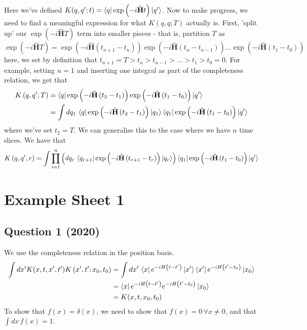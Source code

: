 \documentclass[11pt, oneside]{article}   	%
\theoremstyle{slanted}
\renewcommand{\op}[1]{\hat{\mathbf{#1}}}
\begin{document}
Here we've defined $ K ( q , q '; t )  = \bra{q}\exp\left(  - i \op{H } t  \right) \ket{ q ' } $. 
Now to make progress, we need to find
a meaningful expression for what $ K \left( q, q ; T \right)  $ 
actually is. First, 'split up' 
our $ \exp (  - i \op{H } T)$ term into smaller pieces - 
that is, partition $ T $ as 
\begin{equation}
	\exp\left(  - i \op{H } T  \right)  = 
	\exp \left(  - i \op{H } \left( t_{ n + 1 }  - t _ n  \right)   \right) \exp \left(  - i \op{H } \left( t_n  - t_{ n - 1 }  \right)   \right)  \dots \exp\left(  - i \op{H } \left( t _ 1  - t _ 0  \right)   \right)  
\end{equation} here, we set by definition that 
$ t_{ n + 1 }  =T  > t _ n > t _{ n - 1 } > \dots > t _ 1 > t _ 0 = 0 $. For example, setting $ n = 1$ and inserting one 
integral as part of the completeness relation, 
we get that 
\begin{align*}
	K \left( q, q' ; T  \right)  &=  
	\bra{ q }\exp\left(  - i \op{H } \left( t_2 - t_1  \right)  \right) \exp\left(  - i \op{ H } \left( t_1  - t_0   \right)   \right) \ket{q ' }  \\
	&=  \int d q_1 \,  
	\bra{ q } \exp\left(  - i \op{H } \left( t_2  - t_1  \right) \right)\ket{q_1 } \bra{q_1 } \exp\left( - i \op{H } \left( t_1  - t_0  \right)   \right)\ket{q ' } 
\end{align*}
where we've set $ t_2 = T $. We can generalise this 
to the case where we have $ n $ time slices. We 
have that 
\begin{equation}
	K\left( q, q' , r  \right)   = 
	\int \prod_{ i = 1 } ^ n \left( d q _  r \, 
	\bra{q _{ r +  1} } \exp \left(  - i \op{ H } 
\left(  t _{ r + 1 }  - t _ r  \right)  \right) \ket{q _ r }\right)\bra{q _  1}\exp\left(  - i \op{H } \left( t_1 - t_0  \right)   \right) \ket{q ' } 
\end{equation}

\pagebreak
\section*{Example Sheet 1}

\subsection*{Question 1 (2020)}
We use the completeness relation 
in the position basis. 
\begin{align*}
	\int dx ' K ( x, t, x ' , t ' ) K \left( x' , t ' ; x_0 , t_0  \right)  
	&=  \int dx ' \, \bra{ x } e ^{  - i H \left( t - t '  \right)  } 
	\ket{ x' } \bra{ x ' } e ^{  - i H \left(  t ' -  t_0  \right)  } \ket{ x_0 } \\ 
	&=  \bra{ x } e ^{  - i H \left(  t - t '  \right)  } e ^{   - i H 
	\left( t '  - t_0  \right)  } \ket{ x_0 }  \\ 
	&=  K ( x, t , x_0 , t_0 ) 
\end{align*}
To show that $ f ( x )  = \delta ( x ) $, 
we need to show that $ f (x )  = 0 \, \forall x \neq 0 $, 
and that $ \int dx \, f ( x )  = 1 $. 
\end{document}
